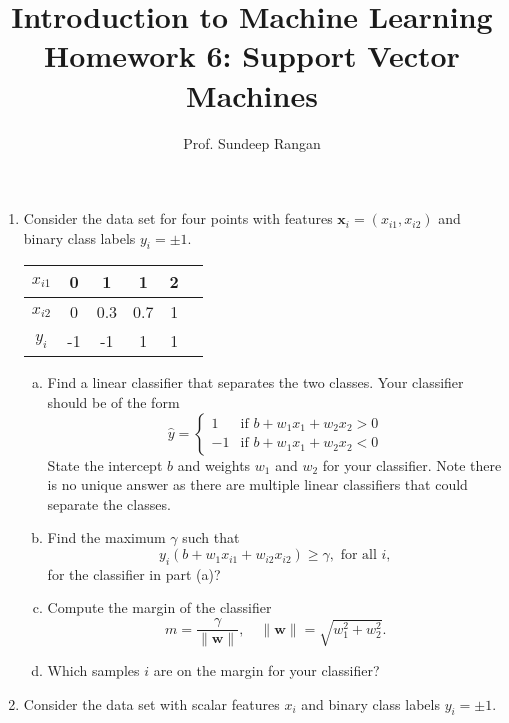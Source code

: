 \documentclass[11pt]{article}
\newcommand{\wbf}{\mathbf{w}}
\newcommand{\xbf}{\mathbf{x}}
\begin{document}
\title{Introduction to Machine Learning\\
Homework 6:  Support Vector Machines}
\author{Prof. Sundeep Rangan}
\date{}

\maketitle

\begin{enumerate}

\item Consider the data set for four points with
features $\xbf_i=(x_{i1},x_{i2})$ and binary class
labels $y_i=\pm 1$.

\begin{center}
\begin{tabular}{|c|c|c|c|c|c|} \hline
$x_{i1}$ & 0 & 1 & 1 & 2 \\ \hline
$x_{i2}$ & 0 & 0.3 & 0.7 & 1 \\ \hline
$y_i$ & -1 & -1 & 1 & 1 \\ \hline
\end{tabular}
\end{center}

\begin{enumerate}[(a)]
\item Find a linear classifier that separates the two classes.
Your classifier should be of the form
\[
    \hat{y} = \begin{cases}
        1 & \mbox{if } b + w_1 x_1 + w_2 x_2 > 0 \\
        -1 & \mbox{if } b + w_1 x_1 + w_2 x_2 < 0
    \end{cases}
\]
State the intercept $b$ and weights $w_1$ and $w_2$ for your classifier.
Note there is no unique answer as there are multiple linear classifiers
that could separate the classes.

\item Find the maximum $\gamma$ such that
\[
    y_i(b+w_1x_{i1} + w_{i2}x_{i2}) \geq \gamma, \mbox{ for all } i,
\]
for the classifier in part (a)?

\item Compute the margin of the classifier
\[
    m = \frac{\gamma}{\|\wbf\|}, \quad \|\wbf\|= \sqrt{ w_1^2 + w_2^2 }.
\]

\item Which samples $i$ are on the margin for your classifier?
\end{enumerate}

\item  Consider the data set with scalar features $x_i$
and binary class labels $y_i=\pm 1$.


\end{enumerate}
\end{document}
